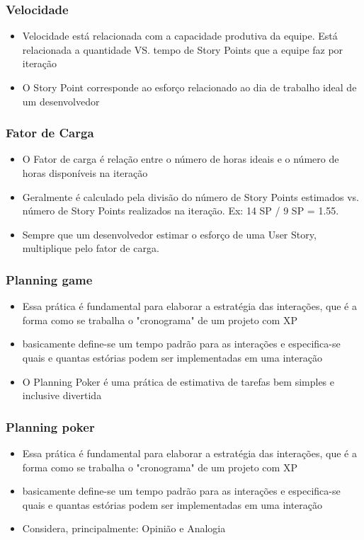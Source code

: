 \begin{frame}
 \frametitle{Velocidade}
 \begin{itemize}
  \item Velocidade está relacionada com a capacidade produtiva da equipe. Está relacionada a quantidade VS. tempo de Story Points que a equipe faz por iteração
  \item O Story Point corresponde ao esforço relacionado ao dia de trabalho ideal de um desenvolvedor
 \end{itemize}
\end{frame}

\begin{frame}
 \frametitle{Fator de Carga}
 \begin{itemize}
  \item O Fator de carga é relação entre o número de horas ideais e o número de horas disponíveis na iteração 
  \item Geralmente é calculado pela divisão do número de Story Points estimados vs. número de Story Points realizados na iteração. Ex: 14 SP / 9 SP = 1.55.
  \item Sempre que um desenvolvedor estimar o esforço de uma User Story, multiplique pelo fator de carga.
 \end{itemize}
\end{frame}

\begin{frame}
 \frametitle{Planning game}
 \begin{itemize}
  \item Essa prática é fundamental para elaborar a estratégia das interações, que é a forma como se trabalha o "cronograma" de um projeto com XP
  \item  basicamente define-se um tempo padrão para as interações e especifica-se quais e quantas estórias podem ser implementadas em uma interação
  \item O Planning Poker é uma prática de estimativa de tarefas bem simples e inclusive divertida
 \end{itemize}
\end{frame}

\begin{frame}
 \frametitle{Planning poker}
 \begin{itemize}
  \item Essa prática é fundamental para elaborar a estratégia das interações, que é a forma como se trabalha o "cronograma" de um projeto com XP
  \item  basicamente define-se um tempo padrão para as interações e especifica-se quais e quantas estórias podem ser implementadas em uma interação
  \item Considera, principalmente: Opinião  e Analogia
 \end{itemize}
\end{frame}

